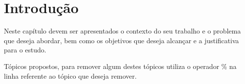 

\chapter{Introdução}
    \label{cha:intro}

    Neste capítulo devem ser apresentados o contexto do seu trabalho e o problema que deseja abordar, bem como os objetivos que deseja alcançar e a justificativa para o estudo.
    
    Tópicos propostos, para remover algum destes tópicos utiliza o operador \% na linha referente ao tópico que deseja remover.
    
    
    
    
    